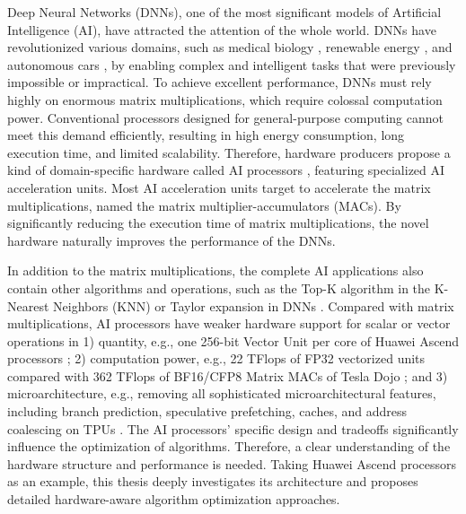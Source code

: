 \documentclass[12pt]{extbook}
\begin{document}
Deep Neural Networks (DNNs), one of the most significant models of Artificial Intelligence (AI), have attracted the attention of the whole world. DNNs have revolutionized various domains, such as medical biology \cite{zitnik2019machine}, renewable energy \cite{gensler2016deep}, and autonomous cars \cite{tian2018deeptest}, by enabling complex and intelligent tasks that were previously impossible or impractical. To achieve excellent performance, DNNs must rely highly on enormous matrix multiplications, which require colossal computation power. Conventional processors designed for general-purpose computing cannot meet this demand efficiently, resulting in high energy consumption, long execution time, and limited scalability. Therefore, hardware producers propose a kind of domain-specific hardware called AI processors \cite{Dojo, DBLP:conf/isca/JouppiK0MNNPSST23, Mi300, H100, DBLP:conf/isscc/OuyangDML21, DBLP:conf/hotchips/LiaoTXZ19, 910}, featuring specialized AI acceleration units. Most AI acceleration units target to accelerate the matrix multiplications, named the matrix multiplier-accumulators (MACs). By significantly reducing the execution time of matrix multiplications, the novel hardware naturally improves the performance of the DNNs. 

In addition to the matrix multiplications, the complete AI applications also contain other algorithms and operations, such as the Top-K algorithm in the K-Nearest Neighbors (KNN) \cite{1053964} or Taylor expansion in DNNs \cite{DBLP:conf/cvpr/JinYWMH23}. Compared with matrix multiplications, AI processors have weaker hardware support for scalar or vector operations in 1) quantity, e.g., one 256-bit Vector Unit per core of Huawei Ascend processors \cite{DBLP:conf/hotchips/LiaoTXZ19}; 2) computation power, e.g., 22 TFlops of FP32 vectorized units compared with 362 TFlops of BF16/CFP8 Matrix MACs of Tesla Dojo \cite{Dojo}; and 3) microarchitecture, e.g., removing all sophisticated microarchitectural features, including branch prediction, speculative prefetching, caches, and address coalescing on TPUs \cite{DBLP:conf/isca/JouppiYPPABBBBB17}. The AI processors' specific design and tradeoffs significantly influence the optimization of algorithms. Therefore, a clear understanding of the hardware structure and performance is needed. Taking Huawei Ascend processors \cite{DBLP:conf/hotchips/LiaoTXZ19} as an example, this thesis deeply investigates its architecture and proposes detailed hardware-aware algorithm optimization approaches.
\end{document}
